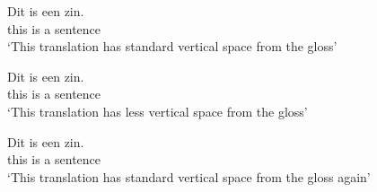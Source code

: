 \ea 
\gll Dit is een zin.\\ 
    this is a sentence\\
\glt `This translation has standard vertical space from the gloss'
\z

\nogltOffset

\ea 
\gll Dit is een zin.\\ 
    this is a sentence\\
\glt `This translation has less vertical space from the gloss'
\z

\resetgltOffset

\ea 
\gll Dit is een zin.\\ 
    this is a sentence\\
\glt `This translation has standard vertical space from the gloss again'
\z
